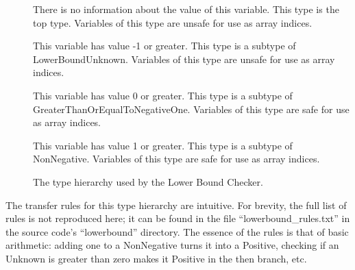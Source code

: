\begin{description}
\item[]
  There is no information about the value of this variable.
  This type is the top type. Variables of this type are
  unsafe for use as array indices.
\item[]
  This variable has value -1 or greater. This type is a subtype of LowerBoundUnknown.
  Variables of this type are unsafe for use as array indices.
\item[]
  This variable has value 0 or greater. This type is a subtype of GreaterThanOrEqualToNegativeOne.
  Variables of this type are safe for use as array indices.
\item[]
  This variable has value 1 or greater. This type is a subtype of NonNegative.
  Variables of this type are safe for use as array indices.
\end{description}

\begin{figure}
\caption{The type hierarchy used by the Lower Bound Checker.}
\label{fig-lowerbound-types}
\end{figure}

The transfer rules for this type hierarchy are intuitive. For brevity,
the full list of rules is not reproduced here; it can be found in the file
``lowerbound\_rules.txt'' in the source code's ``lowerbound'' directory.
The essence of the rules is that of basic arithmetic: adding one to a
NonNegative turns it into a Positive, checking if an Unknown is greater
than zero makes it Positive in the then branch, etc.
